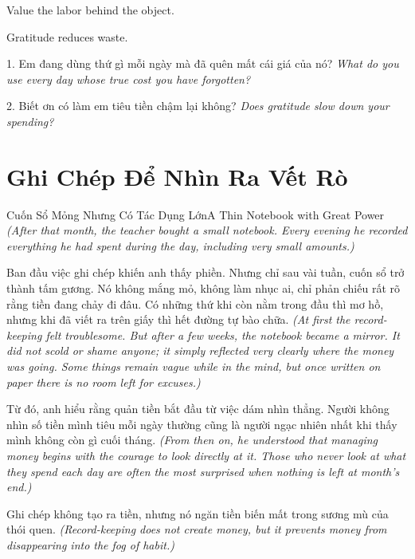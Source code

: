 \begin{ghinhoanh}
Value the labor behind the object.

Gratitude reduces waste.
\end{ghinhoanh}

\begin{tuhocnhanh}
1. Em đang dùng thứ gì mỗi ngày mà đã quên mất cái giá của nó? \textit{What do you use every day whose true cost you have forgotten?}

2. Biết ơn có làm em tiêu tiền chậm lại không? \textit{Does gratitude slow down your spending?}
\end{tuhocnhanh}
\ngancach

\section{Ghi Chép Để Nhìn Ra Vết Rò}
\begin{truyen}{Cuốn Sổ Mỏng Nhưng Có Tác Dụng Lớn}{A Thin Notebook with Great Power}
\textit{(After that month, the teacher bought a small notebook. Every evening he recorded everything he had spent during the day, including very small amounts.)}

Ban đầu việc ghi chép khiến anh thấy phiền. Nhưng chỉ sau vài tuần, cuốn sổ trở thành tấm gương. Nó không mắng mỏ, không làm nhục ai, chỉ phản chiếu rất rõ rằng tiền đang chảy đi đâu. Có những thứ khi còn nằm trong đầu thì mơ hồ, nhưng khi đã viết ra trên giấy thì hết đường tự bào chữa.
\textit{(At first the record-keeping felt troublesome. But after a few weeks, the notebook became a mirror. It did not scold or shame anyone; it simply reflected very clearly where the money was going. Some things remain vague while in the mind, but once written on paper there is no room left for excuses.)}

Từ đó, anh hiểu rằng quản tiền bắt đầu từ việc dám nhìn thẳng. Người không nhìn số tiền mình tiêu mỗi ngày thường cũng là người ngạc nhiên nhất khi thấy mình không còn gì cuối tháng.
\textit{(From then on, he understood that managing money begins with the courage to look directly at it. Those who never look at what they spend each day are often the most surprised when nothing is left at month’s end.)}
\end{truyen}

\begin{baihoc}
Ghi chép không tạo ra tiền, nhưng nó ngăn tiền biến mất trong sương mù của thói quen.
\textit{(Record-keeping does not create money, but it prevents money from disappearing into the fog of habit.)}
\end{baihoc}

